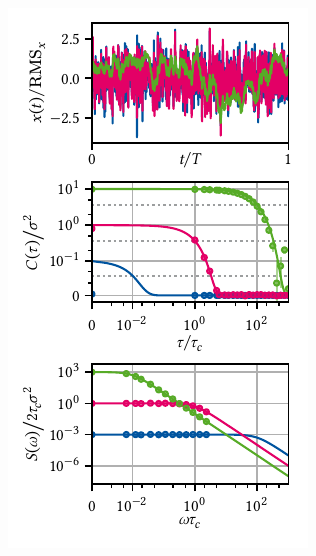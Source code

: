 \begin{marginfigure}[*-13]
    \centering
    \includegraphics{img/pdf/spectrometer/lorentzian_psdcorr}
    \caption[]{
        Ornstein-Uhlenbeck process.
        Simulated time traces, autocorrelation function, and \gls{psd} of the Ornstein-Uhlenbeck process.
        Top: Simulated time traces using the algorithm presented in \cref{sec:app:ff:time_domain_methods}.
        The data are normalized to the computed \gls{rms} (equal to $\sigma$ in the continuous case).
        Middle: Theoretical autocorrelation function (\cref{eq:speck:ou:autocorrelation}, solid lines) computed from the simulated data averaged over \num{e3} traces (circles, subset of points).
        Error bars indicate the standard error of the mean, axes are scaled with respect to the parameters of the magenta data, and data are plotted on an $\asinh$-scale.
        Bottom: Theoretical \gls{psd} (\cref{eq:speck:ou:psd}, solid lines) and periodograms computed from the simulated data using , \cf \cref{eq:speck:periodogram}, averaged over \num{e3} traces (circles, subset of points).
        Axes are again scaled with respect to the parameters of the magenta data and plotted on an $\asinh$-scale.
        Parameters are $\tau_c = \dt\times\{\num{e-2},\num{e0},\num{e2}\}$ and $\sigma^2=\sqrt{\tau_c}/4$ for blue, magenta, and green data, respectively.
    }
    \label{fig:speck:psdcorr}
\end{marginfigure}

